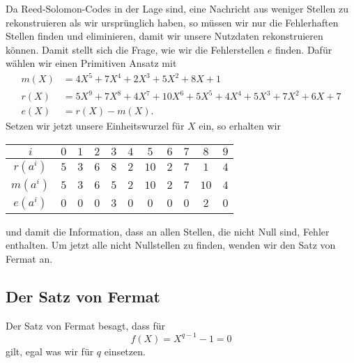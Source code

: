 Da Reed-Solomon-Codes in der Lage sind, eine Nachricht aus weniger Stellen zu rekonstruieren als wir ursprünglich haben, so müssen wir nur die Fehlerhaften Stellen finden und eliminieren, damit wir unsere Nutzdaten rekonstruieren können.
Damit stellt sich die Frage, wie wir die Fehlerstellen $e$ finden.
Dafür wählen wir einen Primitiven Ansatz mit
\begin{align}
	m(X) & = 4X^5 + 7X^4 + 2X^3 + 5X^2 + 8X + 1 \\
	r(X) & = 5X^9 + 7X^8 + 4X^7 + 10X^6 + 5X^5 + 4X^4 + 5X^3 + 7X^2 + 6X + 7 \\
	e(X) & = r(X) - m(X).
\end{align}
Setzen wir jetzt unsere Einheitswurzel für $X$ ein, so erhalten wir
\begin{center}
\begin{tabular}{c c c c c c c c c c c}
	\hline
	$i$& $0$& $1$& $2$& $3$& $4$& $5$& $6$& $7$& $8$& $9$\\
	\hline
	$r(a^{i})$& $5$& $3$& $6$& $8$& $2$& $10$& $2$& $7$& $1$& $4$\\
	$m(a^{i})$& $5$& $3$& $6$& $5$& $2$& $10$& $2$& $7$& $10$& $4$\\
	$e(a^{i})$& $0$& $0$& $0$& $3$& $0$& $0$& $0$& $0$& $2$& $0$\\
	\hline
\end{tabular}
\end{center}
und damit die Information, dass an allen Stellen, die nicht Null sind, Fehler enthalten.
Um jetzt alle nicht Nullstellen zu finden, wenden wir den Satz von Fermat an. 

\subsection{Der Satz von Fermat
\label{reedsolomon:subsection:fermat}}
Der Satz von Fermat besagt, dass für
\[
f(X) = X^{q-1} -1 = 0
\] 
gilt, egal was wir für $q$ einsetzen.

